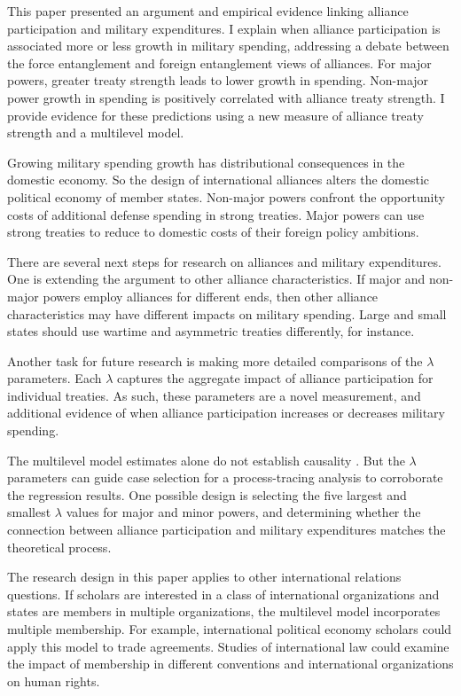 \documentclass[12pt]{article}
\begin{document}
This paper presented an argument and empirical evidence linking alliance participation and military expenditures. 
I explain when alliance participation is associated more or less growth in military spending, addressing a debate between the force entanglement and foreign entanglement views of alliances. 
For major powers, greater treaty strength leads to lower growth in spending. 
Non-major power growth in spending is positively correlated with alliance treaty strength. 
I provide evidence for these predictions using a new measure of alliance treaty strength and a multilevel model. 


Growing military spending growth has distributional consequences in the domestic economy. 
So the design of international alliances alters the domestic political economy of member states. 
Non-major powers confront the opportunity costs of additional defense spending in strong treaties.
Major powers can use strong treaties to reduce to domestic costs of their foreign policy ambitions.  


There are several next steps for research on alliances and military expenditures. 
One is extending the argument to other alliance characteristics. 
If major and non-major powers employ alliances for different ends, then other alliance characteristics may have different impacts on military spending. 
Large and small states should use wartime and asymmetric treaties differently, for instance. 


Another task for future research is making more detailed comparisons of the $\lambda$ parameters. 
Each $\lambda$ captures the aggregate impact of alliance participation for individual treaties.
As such, these parameters are a novel measurement, and additional evidence of when alliance participation increases or decreases military spending. 


The multilevel model estimates alone do not establish causality \citep{Seawright2016}. 
But the $\lambda$ parameters can guide case selection for a process-tracing analysis to corroborate the regression results.
One possible design is selecting the five largest and smallest $\lambda$ values for major and minor powers, and determining whether the connection between alliance participation and military expenditures matches the theoretical process.


The research design in this paper applies to other international relations questions.
If scholars are interested in a class of international organizations and states are members in multiple organizations, the multilevel model incorporates multiple membership.
For example, international political economy scholars could apply this model to trade agreements. 
Studies of international law could examine the impact of membership in different conventions and international organizations on human rights. 
\end{document}

